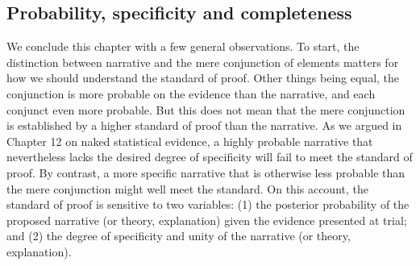 \documentclass[
  10pt,
  dvipsnames,enabledeprecatedfontcommands]{scrartcl}
\begin{document}
\hypertarget{probability-specificity-and-completeness}{%
\subsection{Probability, specificity and
completeness}\label{probability-specificity-and-completeness}}

We conclude this chapter with a few general observations. To start, the
distinction between narrative and the mere conjunction of elements
matters for how we should understand the standard of proof. Other things
being equal, the conjunction is more probable on the evidence than the
narrative, and each conjunct even more probable. But this does not mean
that the mere conjunction is established by a higher standard of proof
than the narrative. As we argued in Chapter 12 on naked statistical
evidence,  a highly probable
narrative that nevertheless lacks the desired degree of specificity will
fail to meet the standard of proof. By contrast, a more specific
narrative that is otherwise less probable than the mere conjunction
might well meet the standard. On this account, the standard of proof is
sensitive to two variables: (1) the posterior probability of the
proposed narrative (or theory, explanation) given the evidence presented
at trial; and (2) the degree of specificity and unity of the narrative
(or theory, explanation).
\end{document}

